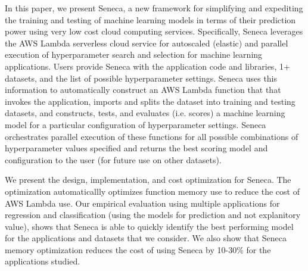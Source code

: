 
In this paper, we present Seneca, a new framework for simplifying and expediting
the training and testing of machine learning models in terms of their prediction 
power using very low cost cloud computing services.
Specifically, Seneca leverages the AWS Lambda serverless cloud service for autoscaled
(elastic) and parallel execution of hyperparameter search and selection for machine learning
applications.  
Users provide Seneca with the application code and libraries, 1+ datasets, and the list 
of possible hyperparameter settings.  Seneca uses this 
information to automatically construct an AWS Lambda function that
that invokes the application, imports and splits the dataset into training
and testing datasets, and constructs, tests, and evaluates (i.e. scores) a machine
learning model for a particular configuration of hyperparameter settings.  
Seneca orchestrates parallel execution of these functions for all possible 
combinations of hyperparameter values specified and returns the best scoring model
and configuration to the user (for future use on other datasets).

We present the design, implementation, and cost optimization for Seneca.
The optimization automaticallly optimizes function memory use to reduce the cost
of AWS Lambda use.  Our empirical evaluation using
multiple applications for regression and classification (using
the models for prediction and not explanitory value), shows that Seneca is able to quickly
identify the best performing model for the applications and datasets that we consider.  
We also show that Seneca memory optimization reduces the cost of using
Seneca by 10-30\% for the applications studied.


